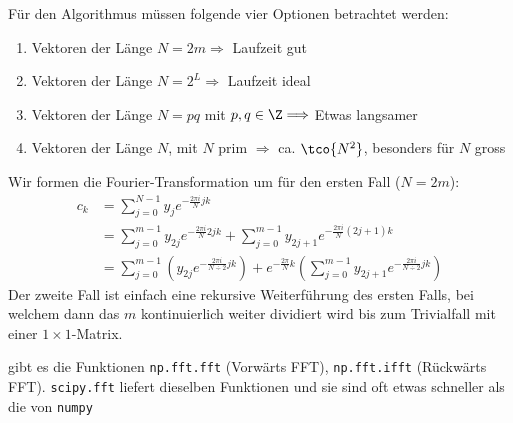 Für den Algorithmus müssen folgende vier Optionen betrachtet werden:
\begin{enumerate}[label=\Roman*]
    \item Vektoren der Länge $N = 2m \Longrightarrow$ Laufzeit gut
    \item Vektoren der Länge $N = 2^L \Longrightarrow$ Laufzeit ideal
    \item Vektoren der Länge $N = pq$ mit $p, q \in \Z \Longrightarrow$ Etwas langsamer
    \item Vektoren der Länge $N$, mit $N$ prim $\Longrightarrow$ ca. $\tco{N^2}$, besonders für $N$ gross
\end{enumerate}
Wir formen die Fourier-Transformation um für den ersten Fall ($N = 2m$):
\rmvspace
\begin{align*}
    c_k & = \sum_{j = 0}^{N - 1} y_j e^{- \frac{2\pi i}{N} jk}                                                                     \\
        & = \sum_{j = 0}^{m - 1} y_{2j} e^{-\frac{2 \pi i}{N}2jk} + \sum_{j = 0}^{m - 1} y_{2j + 1} e^{-\frac{2\pi i}{N}(2j + 1)k} \\
        & = \sum_{j = 0}^{m - 1} \left( y_{2j} e^{-\frac{2 \pi i}{N \div 2}jk} \right)
    + e^{- \frac{2\pi}{N} k} \left( \sum_{j = 0}^{m - 1} y_{2j + 1} e^{-\frac{2\pi i}{N \div 2}jk} \right)
\end{align*}
Der zweite Fall ist einfach eine rekursive Weiterführung des ersten Falls,
bei welchem dann das $m$ kontinuierlich weiter dividiert wird bis zum Trivialfall mit einer $1 \times 1$-Matrix.

\innumpy gibt es die Funktionen \texttt{np.fft.fft} (Vorwärts FFT), \texttt{np.fft.ifft} (Rückwärts FFT). 
\texttt{scipy.fft} liefert dieselben Funktionen und sie sind oft etwas schneller als die von \texttt{numpy}
